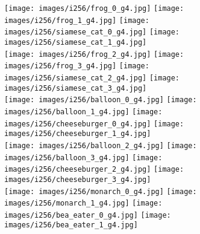 \documentclass[nohyperref]{article}
\theoremstyle{plain}
\theoremstyle{definition}
\theoremstyle{remark}
\begin{document}
\begin{figure}
\begin{subfigure}[b]{0.495\textwidth}
\texttt{[image: images/i256/frog\_0\_g4.jpg]} \hspace{.04cm} \texttt{[image: images/i256/frog\_1\_g4.jpg]} \hspace{.04cm}
    \texttt{[image: images/i256/siamese\_cat\_0\_g4.jpg]} \hspace{.04cm} \texttt{[image: images/i256/siamese\_cat\_1\_g4.jpg]} \\ \vspace{.17cm}
\texttt{[image: images/i256/frog\_2\_g4.jpg]} \hspace{.04cm } \texttt{[image: images/i256/frog\_3\_g4.jpg]} \hspace{.04cm}
    \texttt{[image: images/i256/siamese\_cat\_2\_g4.jpg]} \hspace{.04cm } \texttt{[image: images/i256/siamese\_cat\_3\_g4.jpg]} \\ \vspace{.17cm}
\texttt{[image: images/i256/balloon\_0\_g4.jpg]} \hspace{.04cm} \texttt{[image: images/i256/balloon\_1\_g4.jpg]} \hspace{.04cm}
    \texttt{[image: images/i256/cheeseburger\_0\_g4.jpg]} \hspace{.04cm} \texttt{[image: images/i256/cheeseburger\_1\_g4.jpg]} \\ \vspace{.17cm}
\texttt{[image: images/i256/balloon\_2\_g4.jpg]} \hspace{.04cm } \texttt{[image: images/i256/balloon\_3\_g4.jpg]} \hspace{.04cm}
    \texttt{[image: images/i256/cheeseburger\_2\_g4.jpg]} \hspace{.04cm } \texttt{[image: images/i256/cheeseburger\_3\_g4.jpg]} \\ \vspace{.17cm}
\texttt{[image: images/i256/monarch\_0\_g4.jpg]} \hspace{.04cm} \texttt{[image: images/i256/monarch\_1\_g4.jpg]} \hspace{.04cm}
    \texttt{[image: images/i256/bea\_eater\_0\_g4.jpg]} \hspace{.04cm} \texttt{[image: images/i256/bea\_eater\_1\_g4.jpg]} \\ \vspace{.17cm}

\end{subfigure}
\end{figure}
\end{document}
